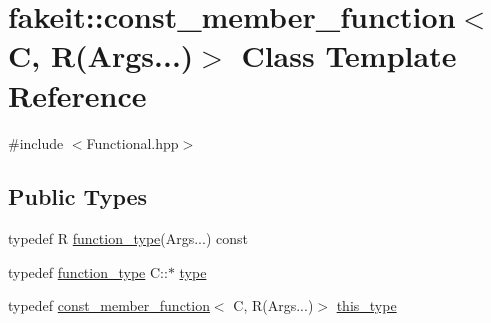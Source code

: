 \hypertarget{classfakeit_1_1const__member__function_3_01C_00_01R_07Args_8_8_8_08_4}{}\section{fakeit\+::const\+\_\+member\+\_\+function$<$ C, R(Args...)$>$ Class Template Reference}
\label{classfakeit_1_1const__member__function_3_01C_00_01R_07Args_8_8_8_08_4}


{\ttfamily \#include $<$Functional.\+hpp$>$}

\subsection*{Public Types}
\begin{DoxyCompactItemize}
\item 
typedef R \mbox{\hyperlink{classfakeit_1_1const__member__function_3_01C_00_01R_07Args_8_8_8_08_4_ad143de99770cbbb20eeb588365312860}{function\+\_\+type}}(Args...) const
\item 
typedef \mbox{\hyperlink{classfakeit_1_1const__member__function_3_01C_00_01R_07Args_8_8_8_08_4_ad143de99770cbbb20eeb588365312860}{function\+\_\+type}} C\+::$\ast$ \mbox{\hyperlink{classfakeit_1_1const__member__function_3_01C_00_01R_07Args_8_8_8_08_4_ab962f803e5a8b5b2078ee8674900288c}{type}}
\item 
typedef \mbox{\hyperlink{classfakeit_1_1const__member__function}{const\+\_\+member\+\_\+function}}$<$ C, R(Args...)$>$ \mbox{\hyperlink{classfakeit_1_1const__member__function_3_01C_00_01R_07Args_8_8_8_08_4_af7e34265af3f3daedfe6c23d7cd2f36f}{this\+\_\+type}}
\end{DoxyCompactItemize}
